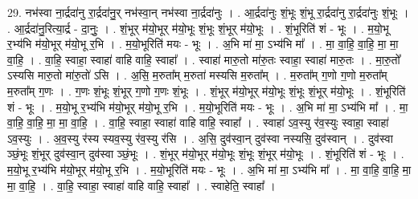 \documentclass[17pt]{extarticle}
\begin{document}
29. नभ॑स्वा ना॒र्द्रदा॑नु रा॒र्द्रदा॑नु॒र् नभ॑स्वा॒न् नभ॑स्वा ना॒र्द्रदा॑नुः । . आ॒र्द्रदा॑नुः शं॒भूः शं॒भू रा॒र्द्रदा॑नु रा॒र्द्रदा॑नुः शं॒भूः । . आ॒र्द्रदा॑नु॒रित्या॒र्द्र - दा॒नुः॒ । . शं॒भूर् म॑यो॒भूर् म॑यो॒भूः शं॒भूः शं॒भूर् म॑यो॒भूः । . शं॒भूरिति॑ शं - भूः । . म॒यो॒भू र॒भ्य॑भि म॑यो॒भूर् म॑यो॒भू र॒भि । . म॒यो॒भूरिति॑ मयः - भूः । . अ॒भि मा॑ मा॒ ऽभ्य॑भि मा᳚ । . मा॒ वा॒हि॒ वा॒हि॒ मा॒ मा॒ वा॒हि॒ । . वा॒हि॒ स्वाहा॒ स्वाहा॑ वाहि वाहि॒ स्वाहा᳚ । . स्वाहा॑ मारु॒तो मा॑रु॒तः स्वाहा॒ स्वाहा॑ मारु॒तः । . मा॒रु॒तो᳚ ऽस्यसि मारु॒तो मा॑रु॒तो॑ ऽसि । . अ॒सि॒ म॒रुता᳚म् म॒रुता॑ मस्यसि म॒रुता᳚म् । . म॒रुता᳚म् ग॒णो ग॒णो म॒रुता᳚म् म॒रुता᳚म् ग॒णः । . ग॒णः शं॒भूः शं॒भूर् ग॒णो ग॒णः शं॒भूः । . शं॒भूर् म॑यो॒भूर् म॑यो॒भूः शं॒भूः शं॒भूर् म॑यो॒भूः । . शं॒भूरिति॑ शं - भूः । . म॒यो॒भू र॒भ्य॑भि म॑यो॒भूर् म॑यो॒भू र॒भि । . म॒यो॒भूरिति॑ मयः - भूः । . अ॒भि मा॑ मा॒ ऽभ्य॑भि मा᳚ । . मा॒ वा॒हि॒ वा॒हि॒ मा॒ मा॒ वा॒हि॒ । . वा॒हि॒ स्वाहा॒ स्वाहा॑ वाहि वाहि॒ स्वाहा᳚ । . स्वाहा॑ ऽव॒स्यु र॑व॒स्युः स्वाहा॒ स्वाहा॑ ऽव॒स्युः । . अ॒व॒स्यु र॑स्य स्यव॒स्यु र॑व॒स्यु र॑सि । . अ॒सि॒ दुव॑स्वा॒न् दुव॑स्वा नस्यसि॒ दुव॑स्वान् । . दुव॑स्वा ञ्छं॒भूः शं॒भूर् दुव॑स्वा॒न् दुव॑स्वा ञ्छं॒भूः । . शं॒भूर् म॑यो॒भूर् म॑यो॒भूः शं॒भूः शं॒भूर् म॑यो॒भूः । . शं॒भूरिति॑ शं - भूः । . म॒यो॒भू र॒भ्य॑भि म॑यो॒भूर् म॑यो॒भू र॒भि । . म॒यो॒भूरिति॑ मयः - भूः । . अ॒भि मा॑ मा॒ ऽभ्य॑भि मा᳚ । . मा॒ वा॒हि॒ वा॒हि॒ मा॒ मा॒ वा॒हि॒ । . वा॒हि॒ स्वाहा॒ स्वाहा॑ वाहि वाहि॒ स्वाहा᳚ । . स्वाहेति॒ स्वाहा᳚ । \newline
\end{document}

